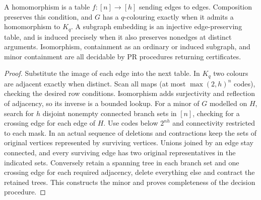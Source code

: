 \begin{proposition}\leavevmode\label{idx:operations-homomorphisms-subgraphs-and-minors}
A homomorphism is a table $f:[n]\to[h]$ sending edges to edges. Composition
preserves this condition, and $G$ has a $q$-colouring exactly when it admits
a homomorphism to $K_q$. A subgraph embedding is an injective edge-preserving
table, and is induced precisely when it also preserves nonedges at distinct
arguments. Isomorphism, containment as an ordinary or induced subgraph, and
minor containment are all decidable by PR procedures returning certificates.
\end{proposition}
\begin{proof}
Substitute the image of each edge into the next table. In $K_q$ two colours
are adjacent exactly when distinct. Scan all maps (at most $\max(2,h)^n$
codes), checking the desired row conditions. Isomorphism adds surjectivity
and reflection of adjacency, so its inverse is a bounded lookup. For a
minor of $G$ modelled on $H$, search for $h$ disjoint nonempty connected
branch sets in $[n]$, checking for a crossing edge for each edge of $H$.
Use codes below $2^{nh}$ and connectivity restricted to each mask. In an
actual sequence of deletions and contractions keep the sets of original
vertices represented by surviving vertices. Unions joined by an edge stay
connected, and every surviving edge has two original representatives in the
indicated sets. Conversely retain a spanning tree in each branch set and
one crossing edge for each required adjacency, delete everything else and
contract the retained trees. This constructs the minor and proves completeness
of the decision procedure.
\end{proof}

